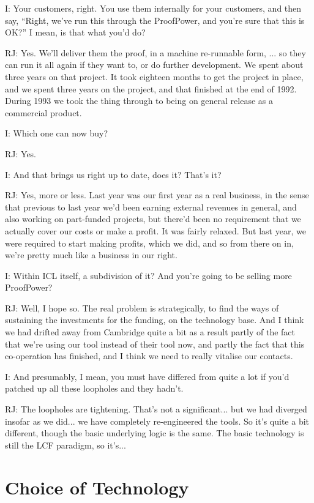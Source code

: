 \documentclass[10pt,titlepage]{book}
\begin{document}
I: Your customers, right.
You use them internally for your customers, and then say, ``Right, we've run this through the ProofPower, and you're sure that this is OK?'' I mean, is that what you'd do?

RJ: Yes.
We'll deliver them the proof, in a machine re-runnable form, ... so they can run it all again if they want to, or do further development.
We spent about three years on that project.
It took eighteen months to get the project in place, and we spent three years on the project, and that finished at the end of 1992.
During 1993 we took the thing through to being on general release as a commercial product.

I: Which one can now buy?

RJ: Yes.

I: And that brings us right up to date, does it?
That's it?

RJ: Yes, more or less. Last year was our first year as a real business, in the sense that  previous to last year we'd been earning external revenues in general, and also working on part-funded projects, but there'd been no requirement that we actually cover our costs or make a profit. It was fairly relaxed. But last year, we were required to start making profits, which we did, and so from there on in, we're pretty much like a business in our right.

I: Within ICL itself, a subdivision of it?
And you're going to be selling more ProofPower?

RJ: Well, I hope so.
The real problem is strategically, to find the ways of sustaining the investments for the funding, on the technology base.
And I think we had drifted away from Cambridge quite a bit as a result partly of the fact that we're using our tool instead of their tool now, and partly the fact that this co-operation has finished, and I think we need to really vitalise our contacts.

I: And presumably, I mean, you must have differed from quite a lot if you'd patched up all these loopholes and they hadn't.

RJ: The loopholes are tightening.
That's not a significant... but we had diverged insofar as we did... we have completely re-engineered the tools.
So it's quite a bit different, though the basic underlying logic is the same.
The basic technology is still the LCF paradigm, so it's...

\section{Choice of Technology}
\end{document}
